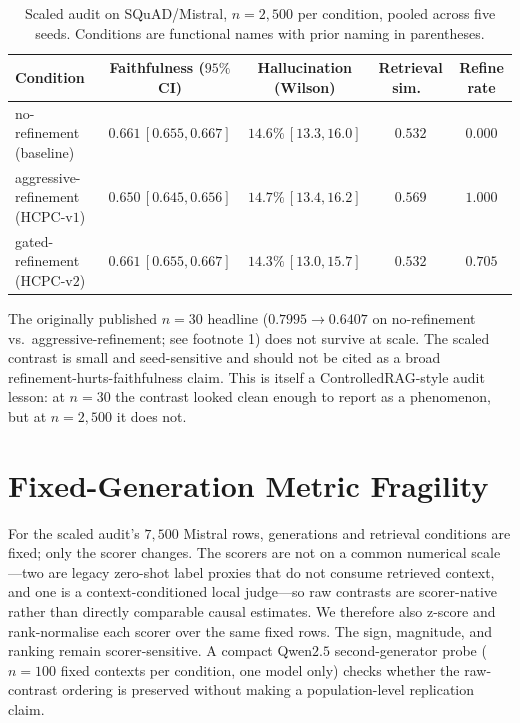 \begin{table}[!htb]
\centering
\caption{Scaled audit on SQuAD/Mistral, $n=2{,}500$ per condition,
pooled across five seeds. Conditions are functional names with prior
naming in parentheses.}
\label{tab:scaling_main}
\footnotesize
\begin{tabular}{lcccc}
\toprule
Condition & Faithfulness ($95\%$ CI) & Hallucination (Wilson) & Retrieval sim.\ & Refine rate \\
\midrule
no-refinement (baseline)        & $0.661 \, [0.655, 0.667]$ & $14.6\% \, [13.3, 16.0]$ & $0.532$ & $0.000$ \\
aggressive-refinement (HCPC-v$1$) & $0.650 \, [0.645, 0.656]$ & $14.7\% \, [13.4, 16.2]$ & $0.569$ & $1.000$ \\
gated-refinement (HCPC-v$2$)    & $0.661 \, [0.655, 0.667]$ & $14.3\% \, [13.0, 15.7]$ & $0.532$ & $0.705$ \\
\bottomrule
\end{tabular}
\end{table}

The originally published $n=30$ headline ($0.7995 \to 0.6407$ on
no-refinement vs.\ aggressive-refinement; see footnote 1) does not
survive at scale. The scaled contrast is small and seed-sensitive
and should not be cited as a broad refinement-hurts-faithfulness
claim. This is itself a ControlledRAG-style audit lesson: at $n=30$
the contrast looked clean enough to report as a phenomenon, but at
$n=2{,}500$ it does not.

\section{Fixed-Generation Metric Fragility}
\label{sec:metric_fragility}

For the scaled audit's $7{,}500$ Mistral rows, generations and
retrieval conditions are fixed; only the scorer changes. The scorers
are not on a common numerical scale---two are legacy zero-shot label
proxies that do not consume retrieved context, and one is a
context-conditioned local judge---so raw contrasts are scorer-native
rather than directly comparable causal estimates. We therefore also
z-score and rank-normalise each scorer over the same fixed rows. The
sign, magnitude, and ranking remain scorer-sensitive. A compact
Qwen$2.5$ second-generator probe ($n=100$ fixed contexts per condition,
one model only) checks whether the raw-contrast ordering is preserved
without making a population-level replication claim.

